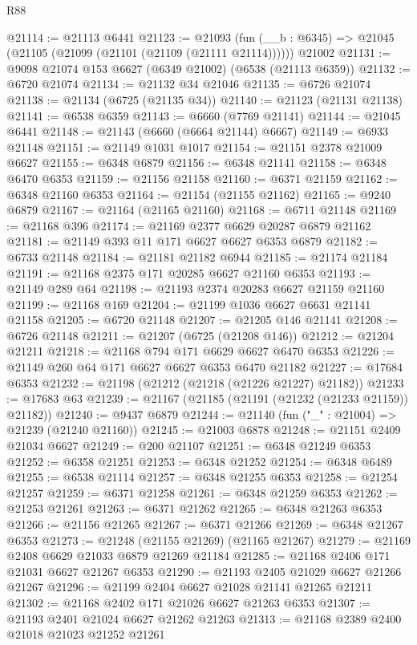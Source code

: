 \begin{lexlean}{R88}
\begin{coremodule}
@21114 := @21113 @6441
@21123 := @21093
    (fun (__b : @6345) => @21045 (@21105 (@21099 (@21101 (@21109 (@21111 @21114))))))
    @21002
@21131 := @9098 @21074 @153 @6627 (@6349 @21002) (@6538 (@21113 @6359))
@21132 := @6720 @21074
@21134 := @21132 @34 @21046
@21135 := @6726 @21074
@21138 := @21134 (@6725 (@21135 @34))
@21140 := @21123 (@21131 @21138)
@21141 := @6538 @6359
@21143 := @6660 (@7769 @21141)
@21144 := @21045 @6441
@21148 := @21143 (@6660 (@6664 @21144) @6667)
@21149 := @6933 @21148
@21151 := @21149 @1031 @1017
@21154 := @21151 @2378 @21009 @6627
@21155 := @6348 @6879
@21156 := @6348 @21141
@21158 := @6348 @6470 @6353
@21159 := @21156 @21158
@21160 := @6371 @21159
@21162 := @6348 @21160 @6353
@21164 := @21154 (@21155 @21162)
@21165 := @9240 @6879
@21167 := @21164 (@21165 @21160)
@21168 := @6711 @21148
@21169 := @21168 @396
@21174 := @21169 @2377 @6629 @20287 @6879 @21162
@21181 := @21149 @393 @11 @171 @6627 @6627 @6353 @6879
@21182 := @6733 @21148
@21184 := @21181 @21182 @6944
@21185 := @21174 @21184
@21191 := @21168 @2375 @171 @20285 @6627 @21160 @6353
@21193 := @21149 @289 @64
@21198 := @21193 @2374 @20283 @6627 @21159 @21160
@21199 := @21168 @169
@21204 := @21199 @1036 @6627 @6631 @21141 @21158
@21205 := @6720 @21148
@21207 := @21205 @146 @21141
@21208 := @6726 @21148
@21211 := @21207 (@6725 (@21208 @146))
@21212 := @21204 @21211
@21218 := @21168 @794 @171 @6629 @6627 @6470 @6353
@21226 := @21149 @260 @64 @171 @6627 @6627 @6353 @6470 @21182
@21227 := @17684 @6353
@21232 := @21198 (@21212 (@21218 (@21226 @21227) @21182))
@21233 := @17683 @63
@21239 := @21167 (@21185 (@21191 (@21232 (@21233 @21159)) @21182))
@21240 := @9437 @6879
@21244 := @21140 (fun ("_" : @21004) => @21239 (@21240 @21160))
@21245 := @21003 @6878
@21248 := @21151 @2409 @21034 @6627
@21249 := @200 @21107
@21251 := @6348 @21249 @6353
@21252 := @6358 @21251
@21253 := @6348 @21252
@21254 := @6348 @6489
@21255 := @6538 @21114
@21257 := @6348 @21255 @6353
@21258 := @21254 @21257
@21259 := @6371 @21258
@21261 := @6348 @21259 @6353
@21262 := @21253 @21261
@21263 := @6371 @21262
@21265 := @6348 @21263 @6353
@21266 := @21156 @21265
@21267 := @6371 @21266
@21269 := @6348 @21267 @6353
@21273 := @21248 (@21155 @21269) (@21165 @21267)
@21279 := @21169 @2408 @6629 @21033 @6879 @21269 @21184
@21285 := @21168 @2406 @171 @21031 @6627 @21267 @6353
@21290 := @21193 @2405 @21029 @6627 @21266 @21267
@21296 := @21199 @2404 @6627 @21028 @21141 @21265 @21211
@21302 := @21168 @2402 @171 @21026 @6627 @21263 @6353
@21307 := @21193 @2401 @21024 @6627 @21262 @21263
@21313 := @21168 @2389 @2400 @21018 @21023 @21252 @21261

\end{coremodule}
\end{lexlean}
